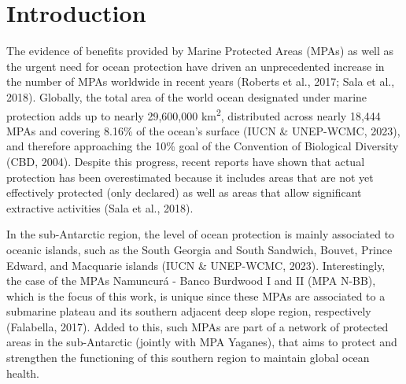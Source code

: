 \documentclass[preprint, 3p,
authoryear]{elsarticle} %
\begin{document}
\hypertarget{introduction}{%
\section{Introduction}\label{introduction}}

The evidence of benefits provided by Marine Protected Areas (MPAs) as
well as the urgent need for ocean protection have driven an
unprecedented increase in the number of MPAs worldwide in recent years
(Roberts et al., 2017; Sala et al., 2018). Globally, the total area of
the world ocean designated under marine protection adds up to nearly
29,600,000 km\textsuperscript{2}, distributed across nearly 18,444 MPAs
and covering 8.16\% of the ocean's surface (IUCN \& UNEP-WCMC, 2023),
and therefore approaching the 10\% goal of the Convention of Biological
Diversity (CBD, 2004). Despite this progress, recent reports have shown
that actual protection has been overestimated because it includes areas
that are not yet effectively protected (only declared) as well as areas
that allow significant extractive activities (Sala et al., 2018).

In the sub-Antarctic region, the level of ocean protection is mainly
associated to oceanic islands, such as the South Georgia and South
Sandwich, Bouvet, Prince Edward, and Macquarie islands (IUCN \&
UNEP-WCMC, 2023). Interestingly, the case of the MPAs Namuncurá - Banco
Burdwood I and II (MPA N-BB), which is the focus of this work, is unique
since these MPAs are associated to a submarine plateau and its southern
adjacent deep slope region, respectively (Falabella, 2017). Added to
this, such MPAs are part of a network of protected areas in the
sub-Antarctic (jointly with MPA Yaganes), that aims to protect and
strengthen the functioning of this southern region to maintain global
ocean health.
\end{document}

